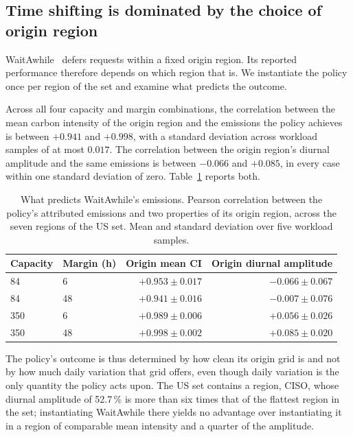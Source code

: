 \subsection{Time shifting is dominated by the choice of origin region}
\label{sec:res-home}

WaitAwhile~\cite{wiesner2021letswait} defers requests within a fixed origin region. Its reported
performance therefore depends on which region that is. We instantiate the
policy once per region of the set and examine what predicts the outcome.

Across all four capacity and margin combinations, the correlation between the
mean carbon intensity of the origin region and the emissions the policy achieves
is between $+0.941$ and $+0.998$, with a standard deviation across workload
samples of at most $0.017$. The correlation between the origin region's diurnal
amplitude and the same emissions is between $-0.066$ and $+0.085$, in every case
within one standard deviation of zero. Table~\ref{tab:homecorr} reports both.

\begin{table}[t]
\centering
\caption{What predicts WaitAwhile's emissions. Pearson correlation between the
policy's attributed emissions and two properties of its origin region, across
the seven regions of the US set. Mean and standard deviation over five workload
samples.}
\label{tab:homecorr}
\begin{tabular}{llrr}
\toprule
Capacity & Margin (h) & Origin mean CI & Origin diurnal amplitude \\
\midrule
 84 &  6 & $+0.953 \pm 0.017$ & $-0.066 \pm 0.067$ \\
 84 & 48 & $+0.941 \pm 0.016$ & $-0.007 \pm 0.076$ \\
350 &  6 & $+0.989 \pm 0.006$ & $+0.056 \pm 0.026$ \\
350 & 48 & $+0.998 \pm 0.002$ & $+0.085 \pm 0.020$ \\
\bottomrule
\end{tabular}
\end{table}

The policy's outcome is thus determined by how clean its origin grid is and not
by how much daily variation that grid offers, even though daily variation is
the only quantity the policy acts upon. The US set contains a region, CISO,
whose diurnal amplitude of 52.7\,\% is more than six times that of the flattest
region in the set; instantiating WaitAwhile there yields no advantage over
instantiating it in a region of comparable mean intensity and a quarter of the
amplitude.

